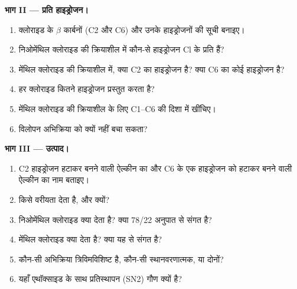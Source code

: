 \begin{problem}
\medskip
\noindent\textbf{भाग II --- प्रति हाइड्रोजन।}
\begin{enumerate}[resume]
  \item क्लोराइड के $\beta$ कार्बनों (C2 और C6) और उनके
        हाइड्रोजनों की सूची बनाइए।
  \item निओमेंथिल क्लोराइड की क्रियाशील  में कौन-से हाइड्रोजन
        Cl के प्रति  हैं?
  \item मेंथिल क्लोराइड की क्रियाशील  में, क्या C2 का हाइड्रोजन
         है? क्या C6 का कोई हाइड्रोजन  है?
  \item हर क्लोराइड कितने  हाइड्रोजन प्रस्तुत करता है?
  \item मेंथिल क्लोराइड की क्रियाशील  के लिए C1--C6 की दिशा में
         खींचिए।
  \item {} विलोपन अभिक्रिया को क्यों नहीं बचा
        सकता?
\end{enumerate}

\medskip
\noindent\textbf{भाग III --- उत्पाद।}
\begin{enumerate}[resume]
  \item C2 हाइड्रोजन हटाकर बनने वाली ऐल्कीन का और
        C6 के एक हाइड्रोजन को हटाकर बनने वाली ऐल्कीन का नाम बताइए।
  \item {} किसे वरीयता देता है, और क्यों?
  \item निओमेंथिल क्लोराइड क्या देता है? क्या 78/22 अनुपात
         से संगत है?
  \item मेंथिल क्लोराइड क्या देता है? क्या यह
         से संगत है?
  \item कौन-सी अभिक्रिया त्रिविमविशिष्ट है, कौन-सी स्थानवरणात्मक, या दोनों?
  \item यहाँ एथॉक्साइड के साथ प्रतिस्थापन (SN2) गौण क्यों है?
\end{enumerate}


\end{problem}

